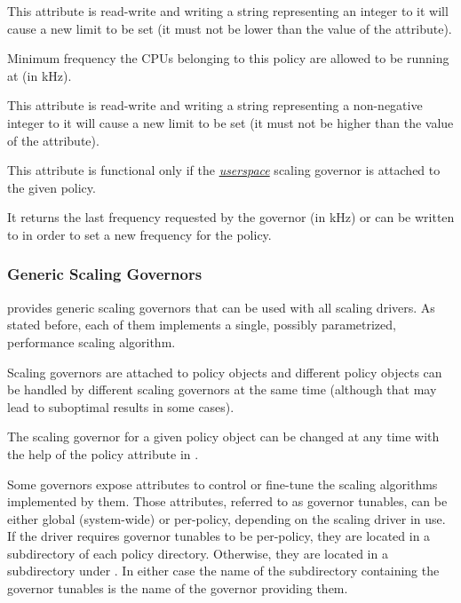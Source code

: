 \documentclass[a4paper,8pt,english]{sphinxmanual}
\begin{document}
\begin{description}
This attribute is read-write and writing a string representing an
integer to it will cause a new limit to be set (it must not be lower
than the value of the  attribute).

\item[{\code{scaling\_min\_freq}}] \leavevmode
Minimum frequency the CPUs belonging to this policy are allowed to be
running at (in kHz).

This attribute is read-write and writing a string representing a
non-negative integer to it will cause a new limit to be set (it must not
be higher than the value of the  attribute).

\item[{\code{scaling\_setspeed}}] \leavevmode
This attribute is functional only if the {\hyperref[admin\string-guide/pm/cpufreq:userspace]{\emph{userspace}}} scaling governor
is attached to the given policy.

It returns the last frequency requested by the governor (in kHz) or can
be written to in order to set a new frequency for the policy.

\end{description}


\subsubsection{Generic Scaling Governors}
\label{admin-guide/pm/cpufreq:generic-scaling-governors}
 provides generic scaling governors that can be used with all
scaling drivers.  As stated before, each of them implements a single, possibly
parametrized, performance scaling algorithm.

Scaling governors are attached to policy objects and different policy objects
can be handled by different scaling governors at the same time (although that
may lead to suboptimal results in some cases).

The scaling governor for a given policy object can be changed at any time with
the help of the  policy attribute in .

Some governors expose  attributes to control or fine-tune the scaling
algorithms implemented by them.  Those attributes, referred to as governor
tunables, can be either global (system-wide) or per-policy, depending on the
scaling driver in use.  If the driver requires governor tunables to be
per-policy, they are located in a subdirectory of each policy directory.
Otherwise, they are located in a subdirectory under
.  In either case the name of the
subdirectory containing the governor tunables is the name of the governor
providing them.
\end{document}
